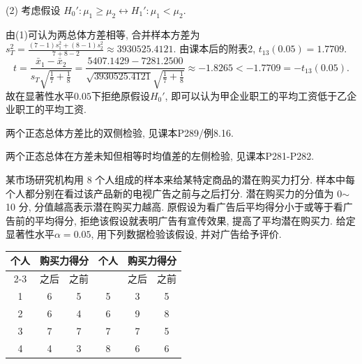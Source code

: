 \documentclass[standard]{ExBook}
\renewenvironment{shaded}{%
  \def\FrameCommand{\fboxsep=\FrameSep \colorbox{shadecolor}}%
  \MakeFramed{\advance\hsize-\width \FrameRestore}%
}{%
  \endMakeFramed
}
\begin{document}
\begin{qitems}
(2) 考虑假设
$
H_0':\mu_1\geq\mu_2
\longleftrightarrow
H_1':\mu_1<\mu_2
$.

由(1)可认为两总体方差相等, 合并样本方差为
$
s_T^2
=
\frac{(7-1)s_1^2+(8-1)s_2^2}{7+8-2}
\approx3930525.4121
$.
由课本后的附表2, $t_{13}(0.05)=1.7709$.
$$
t
=
\frac{\bar{x}_1-\bar{x}_2}
{s_T\sqrt{\frac{1}{7}+\frac{1}{8}}}
=
\frac{5407.1429-7281.2500}
{\sqrt{3930525.4121}\sqrt{\frac{1}{7}+\frac{1}{8}}}
\approx-1.8265
<
-1.7709
=
-t_{13}(0.05).
$$
故在显著性水平$0.05$下拒绝原假设$H_0'$, 即可以认为甲企业职工的平均工资低于乙企业职工的平均工资.

\textcolor{themeColor}{\selectfont {} 两个正态总体方差比的双侧检验, 见课本P289/例8.16.}

\textcolor{themeColor}{\selectfont {} 两个正态总体在方差未知但相等时均值差的左侧检验, 见课本P281-P282.}

\vspace{2.5cm-5em}

    \begin{bbox}
    \begin{shaded}
        \qitem
某市场研究机构用 8 个人组成的样本来给某特定商品的潜在购买力打分. 样本中每个人都分别在看过该产品新的电视广告之前与之后打分. 潜在购买力的分值为 0$\sim$10 分, 分值越高表示潜在购买力越高. 原假设为看广告后平均得分小于或等于看广告前的平均得分, 拒绝该假设就表明广告有宣传效果, 提高了平均潜在购买力. 给定显著性水平$\alpha=0.05$, 用下列数据检验该假设, 并对广告给予评价.
\begin{center}
\setlength{\tabcolsep}{27pt}
\begin{tabular}{c|cc||c|cc}
\hline
\multirow{2}{*}{个人} & \multicolumn{2}{c||}{购买力得分} & \multirow{2}{*}{个人} & \multicolumn{2}{c}{购买力得分} \\ 
\cline{2-3} \cline{5-6}
 & \multicolumn{1}{c}{之后} & \multicolumn{1}{c||}{之前} & & \multicolumn{1}{c}{之后} & \multicolumn{1}{c}{之前} \\ \hline
1 & 6 & 5 & 5 & 3 & 5 \\
2 & 6 & 4 & 6 & 9 & 8 \\
3 & 7 & 7 & 7 & 7 & 5 \\
4 & 4 & 3 & 8 & 6 & 6 \\
\hline
\end{tabular}
\end{center}
    \end{shaded}
    \end{bbox}

\vspace{\dimexpr2.5cm-5em\relax}


\end{qitems}
\end{document}
